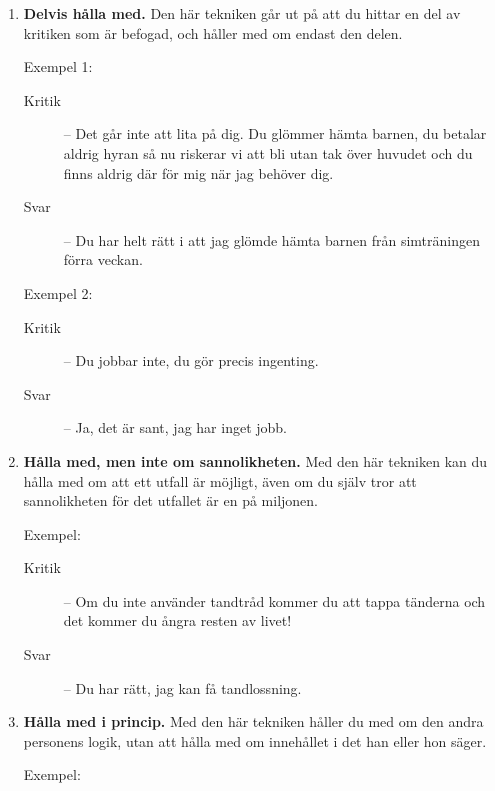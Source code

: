 \documentclass[swedish,a4paper]{book}
\begin{document}
\begin{enumerate}
\begin{enumerate}
\item \textbf{Delvis hålla med.} Den här tekniken går ut på att du hittar en del av kritiken som är befogad, och håller med om endast den delen.

Exempel 1:

\begin{description}

\item[Kritik] -- Det går inte att lita på dig. Du glömmer hämta barnen, du betalar aldrig hyran så nu riskerar vi att bli utan tak över huvudet och du finns aldrig där för mig när jag behöver dig.

\item[Svar] -- Du har helt rätt i att jag glömde hämta barnen från simträningen förra veckan.

\end{description}

Exempel 2:

\begin{description}

\item[Kritik] -- Du jobbar inte, du gör precis ingenting.

\item[Svar] -- Ja, det är sant, jag har inget jobb.

\end{description}

\item \textbf{Hålla med, men inte om sannolikheten.} Med den här tekniken kan du hålla med om att ett utfall är möjligt, även om du själv tror att sannolikheten för det utfallet är en på miljonen.

Exempel:

\begin{description}

\item[Kritik] -- Om du inte använder tandtråd kommer du att tappa tänderna och det kommer du ångra resten av livet!

\item[Svar] -- Du har rätt, jag kan få tandlossning.

\end{description}

\item \textbf{Hålla med i princip.} Med den här tekniken håller du med om den andra personens logik, utan att hålla med om innehållet i det han eller hon säger.

Exempel:


\end{enumerate}
\end{enumerate}
\end{document}
